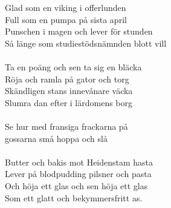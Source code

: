 \vspace{10pt}
Glad som en viking i offerlunden\\
Full som en pumpa på sista april\\
Punschen i magen och lever för stunden\\
Så länge som studiestödsnämnden blott vill\\
\\
Ta en poäng och sen ta sig en bläcka\\
Röja och ramla på gator och torg\\
Skändligen stans innevånare väcka\\
Slumra dan efter i lärdomens borg\\
\\
Se hur med fransiga frackarna på\\
gossarna små hoppa och slå\\
\\
Butter och bakis mot Heidenstam hasta\\
Lever på blodpudding pilsner och pasta\\
Och höja ett glas och sen höja ett glas\\
Som ett glatt och bekymmersfritt as.
